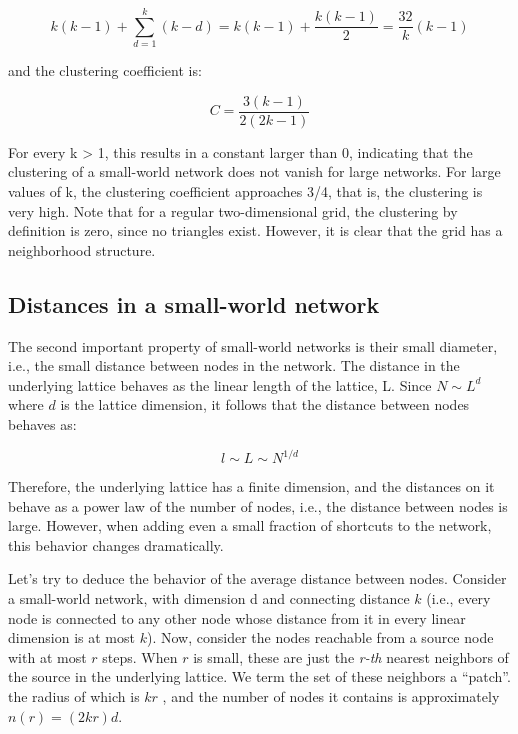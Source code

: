\documentclass[12pt]{article}
\newcommand{\s}{\vspace*{0.4cm}}
\newcommand{\nd}{\noindent}
\begin{document}
\begin{equation}
    k(k-1) + \sum_{d=1}^k (k-d) = k(k-1) + \frac{k(k-1)}{2} = \frac{{3}{2}} k (k-1)
\end{equation}

and the clustering coefficient is:

\begin{equation}
    C = \frac{3 (k-1)}{2(2k-1)}
\end{equation}

For every k > 1, this results in a constant larger than 0, indicating that the clustering of a small-world network does not vanish for large networks. For large values of k, the clustering coefficient approaches 3/4, that is, the clustering is very high. Note that for a regular two-dimensional grid, the clustering by definition is zero, since no triangles exist. However, it is clear that the grid has a neighborhood structure.

\subsection{Distances in a small-world network}

The second important property of small-world networks is their small diameter, i.e., the small distance between nodes in the network. The distance in the underlying lattice behaves as the linear length of the lattice, L. Since $N \sim L^d$  where $d$ is the lattice dimension, it follows that the distance between nodes behaves as:

\begin{equation}
    l \sim L \sim N^{1/d}
\end{equation}

\nd Therefore, the underlying lattice has a finite dimension, and the distances on it behave as a power law of the number of nodes, i.e., the distance between nodes is large. However, when adding even a small fraction of shortcuts to the network, this behavior changes dramatically. \s

Let's try to deduce the behavior of the average distance between nodes. Consider a small-world network, with dimension d and connecting distance $k$ (i.e., every node is connected to any other node whose distance from it in every linear dimension is at most $k$). Now, consider the nodes reachable from a source node with at most $r$ steps. When $r$ is small, these are just the \emph{r-th} nearest neighbors of the source in the underlying lattice. We term the set of these neighbors a “patch”. the radius of which is $kr$ , and the number of nodes it contains is approximately $n(r) = (2kr)d$. \s
\end{document}
